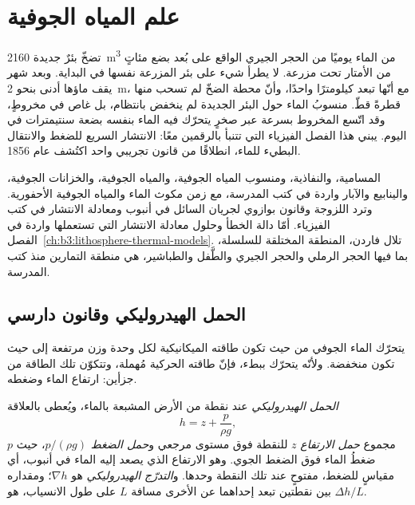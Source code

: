 \chapter{علم المياه الجوفية}\label{ch:b3:hydrogeology}

تضخّ بئرٌ جديدة \qty{2160}{m^3} من الماء يوميًا من الحجر الجيري الواقع على بُعد بضع
مئاتٍ من الأمتار تحت مزرعة. لا يطرأ شيء على بئر المزرعة نفسها
في البداية. وبعد شهر يقف ماؤها أدنى بنحو \qty{2}{m}، مع أنّها تبعد
كيلومترًا واحدًا، وأنّ محطة الضخّ لم تسحب منها قطرةً قطّ. منسوبُ
الماء حول البئر الجديدة لم ينخفض بانتظام، بل غاص في
مخروطٍ، وقد اتّسع المخروط بسرعة عبر صخرٍ يتحرّك فيه الماء
بنفسه بضعة سنتيمترات في اليوم. يبني هذا الفصل الفيزياء التي
تتنبأ بالرقمين معًا: الانتشار السريع للضغط والانتقال البطيء
للماء، انطلاقًا من قانون تجريبي واحد اكتُشف عام 1856.

\begin{recall}
المسامية، والنفاذية، ومنسوب المياه الجوفية، والمياه الجوفية، والخزانات الجوفية،
والينابيع والآبار واردة في كتب المدرسة، مع زمن مكوث الماء
والمياه الجوفية الأحفورية. وترد اللزوجة وقانون بوازوي لجريان السائل في أنبوب
ومعادلة الانتشار في كتب الفيزياء. أمّا دالة الخطأ
وحلول معادلة الانتشار التي تستعملها واردة في
الفصل~\ref{ch:b3:lithosphere-thermal-models}. تلال فاردن، المنطقة المختلقة
للسلسلة، بما فيها الحجر الرملي والحجر الجيري والطَّفل والطباشير، هي
منطقة التمارين منذ كتب المدرسة.
\end{recall}

\section{الحمل الهيدروليكي وقانون دارسي}\label{sec:b3:hydrogeology:darcy}

يتحرّك الماء الجوفي من حيث تكون طاقته الميكانيكية لكل وحدة وزن مرتفعة
إلى حيث تكون منخفضة. ولأنّه يتحرّك ببطء، فإنّ طاقته الحركية
مُهملة، وتتكوّن تلك الطاقة من جزأين: ارتفاع الماء
وضغطه.

\begin{definition}\label{def:b3:hydrogeology:head}
\emph{الحمل الهيدروليكي} عند نقطة من
الأرض المشبعة بالماء، ويُعطى بالعلاقة
\[
h = z + \frac{p}{\rho g} ,
\]
مجموع \emph{حمل الارتفاع} $z$ للنقطة فوق مستوى مرجعي
و\emph{حمل الضغط} $p/(\rho g)$، حيث $p$ ضغطُ الماء فوق
الضغط الجوي. وهو الارتفاع الذي يصعد إليه الماء في
أنبوب، أي مقياسٍ للضغط، مفتوحٍ عند تلك النقطة وحدها. و\emph{التدرّج
الهيدروليكي} هو $\nabla h$؛ ومقداره بين نقطتين
تبعد إحداهما عن الأخرى مسافة $L$ على طول الانسياب، هو $\Delta h/L$.
\end{definition}

